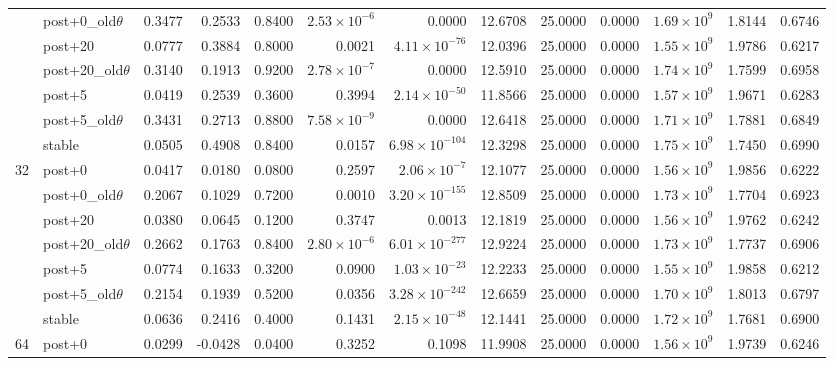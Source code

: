 {\begin{longtable}{@{}llrrrrrrrrrrr@{}}
 & post+0\_old$\theta$ & 0.3477 & 0.2533 & 0.8400 & $2.53\times 10^{-6}$ & 0.0000 & 12.6708 & 25.0000 & 0.0000 & $1.69\times 10^{9}$ & 1.8144 & 0.6746 \\
 & post+20 & 0.0777 & 0.3884 & 0.8000 & 0.0021 & $4.11\times 10^{-76}$ & 12.0396 & 25.0000 & 0.0000 & $1.55\times 10^{9}$ & 1.9786 & 0.6217 \\
 & post+20\_old$\theta$ & 0.3140 & 0.1913 & 0.9200 & $2.78\times 10^{-7}$ & 0.0000 & 12.5910 & 25.0000 & 0.0000 & $1.74\times 10^{9}$ & 1.7599 & 0.6958 \\
 & post+5 & 0.0419 & 0.2539 & 0.3600 & 0.3994 & $2.14\times 10^{-50}$ & 11.8566 & 25.0000 & 0.0000 & $1.57\times 10^{9}$ & 1.9671 & 0.6283 \\
 & post+5\_old$\theta$ & 0.3431 & 0.2713 & 0.8800 & $7.58\times 10^{-9}$ & 0.0000 & 12.6418 & 25.0000 & 0.0000 & $1.71\times 10^{9}$ & 1.7881 & 0.6849 \\
 & stable & 0.0505 & 0.4908 & 0.8400 & 0.0157 & $6.98\times 10^{-104}$ & 12.3298 & 25.0000 & 0.0000 & $1.75\times 10^{9}$ & 1.7450 & 0.6990 \\
\midrule
32 & post+0 & 0.0417 & 0.0180 & 0.0800 & 0.2597 & $2.06\times 10^{-7}$ & 12.1077 & 25.0000 & 0.0000 & $1.56\times 10^{9}$ & 1.9856 & 0.6222 \\
 & post+0\_old$\theta$ & 0.2067 & 0.1029 & 0.7200 & 0.0010 & $3.20\times 10^{-155}$ & 12.8509 & 25.0000 & 0.0000 & $1.73\times 10^{9}$ & 1.7704 & 0.6923 \\
 & post+20 & 0.0380 & 0.0645 & 0.1200 & 0.3747 & 0.0013 & 12.1819 & 25.0000 & 0.0000 & $1.56\times 10^{9}$ & 1.9762 & 0.6242 \\
 & post+20\_old$\theta$ & 0.2662 & 0.1763 & 0.8400 & $2.80\times 10^{-6}$ & $6.01\times 10^{-277}$ & 12.9224 & 25.0000 & 0.0000 & $1.73\times 10^{9}$ & 1.7737 & 0.6906 \\
 & post+5 & 0.0774 & 0.1633 & 0.3200 & 0.0900 & $1.03\times 10^{-23}$ & 12.2233 & 25.0000 & 0.0000 & $1.55\times 10^{9}$ & 1.9858 & 0.6212 \\
 & post+5\_old$\theta$ & 0.2154 & 0.1939 & 0.5200 & 0.0356 & $3.28\times 10^{-242}$ & 12.6659 & 25.0000 & 0.0000 & $1.70\times 10^{9}$ & 1.8013 & 0.6797 \\
 & stable & 0.0636 & 0.2416 & 0.4000 & 0.1431 & $2.15\times 10^{-48}$ & 12.1441 & 25.0000 & 0.0000 & $1.72\times 10^{9}$ & 1.7681 & 0.6900 \\
\midrule
64 & post+0 & 0.0299 & -0.0428 & 0.0400 & 0.3252 & 0.1098 & 11.9908 & 25.0000 & 0.0000 & $1.56\times 10^{9}$ & 1.9739 & 0.6246 \\

\end{longtable}}
